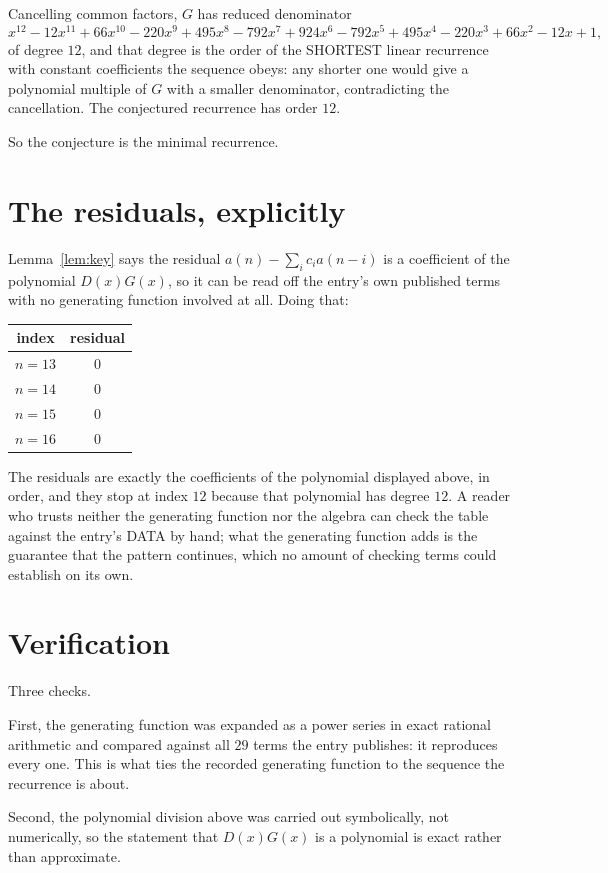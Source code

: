 \documentclass[11pt,a4paper]{article}
\theoremstyle{plain}
\theoremstyle{definition}
\begin{document}
Cancelling common factors, $G$ has reduced denominator
\[
x^{12} - 12 x^{11} + 66 x^{10} - 220 x^{9} + 495 x^{8} - 792 x^{7} + 924 x^{6} - 792 x^{5} + 495 x^{4} - 220 x^{3} + 66 x^{2} - 12 x + 1,
\]
of degree $12$, and that degree is the order of the SHORTEST linear recurrence with
constant coefficients the sequence obeys: any shorter one would give a polynomial multiple of
$G$ with a smaller denominator, contradicting the cancellation. The conjectured recurrence has
order $12$.

So the conjecture is the minimal recurrence.

\section{The residuals, explicitly}

Lemma~\ref{lem:key} says the residual $a(n)-\sum_ic_ia(n-i)$ is a coefficient of the
polynomial $D(x)G(x)$, so it can be read off the entry's own published terms with no
generating function involved at all. Doing that:
\begin{center}
\begin{tabular}{cc}
index & residual \\ \hline
$n=13$ & $0$ \\
$n=14$ & $0$ \\
$n=15$ & $0$ \\
$n=16$ & $0$
\end{tabular}
\end{center}
The residuals are exactly the coefficients of the polynomial displayed above, in order, and
they stop at index $12$ because that polynomial has degree $12$. A reader who trusts
neither the generating function nor the algebra can check the table against the entry's DATA
by hand; what the generating function adds is the guarantee that the pattern continues, which
no amount of checking terms could establish on its own.

\section{Verification}

Three checks.

First, the generating function was expanded as a power series in exact rational arithmetic and
compared against all $29$ terms the entry publishes: it reproduces every one. This is
what ties the recorded generating function to the sequence the recurrence is about.

Second, the polynomial division above was carried out symbolically, not numerically, so the
statement that $D(x)G(x)$ is a polynomial is exact rather than approximate.
\end{document}

